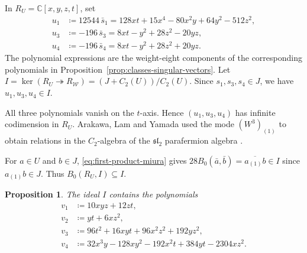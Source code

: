 \documentclass[11pt]{amsart}
\numberwithin{equation}{section}
\newtheorem{proposition}[theorem]{Proposition}
\theoremstyle{definition}
\theoremstyle{remark}
\newcommand{\CC}{\mathbb C}
\begin{document}
 

In $R_U=\CC[x,y,z,t]$, set
\begin{align}
 u_1&\coloneqq 12544\,\bar s_1
     =128xt+15x^4-80x^2y+64y^2-512z^2,\label{eq:u-one}\\[2pt]
 u_3&\coloneqq -196\,\bar s_3=8xt-y^2+28z^2-20yz,\label{eq:u-three}\\[2pt]
 u_4&\coloneqq -196\,\bar s_4=8xt-y^2+28z^2+20yz.\label{eq:u-four}
\end{align}
The polynomial expressions are the weight-eight components of the
corresponding polynomials in Proposition~\ref{prop:classes-singular-vectors}.
Let $I=\ker(R_U\twoheadrightarrow R_{\mathcal W})=(J+C_2(U))/C_2(U)$.
Since $s_1,s_3,s_4\in J$, we have $u_1,u_3,u_4\in I$.
	
All three polynomials vanish on the $t$-axis. Hence $(u_1,u_3,u_4)$
has infinite codimension in $R_U$.
Arakawa, Lam and Yamada used the mode $(W^3)_{(1)}$ to obtain
relations in the $C_2$-algebra of the $\mathfrak{sl}_2$ parafermion
algebra \cite[Proposition~5.4 and Section~6]{ALY}.

For $a\in U$ and $b\in J$, \eqref{eq:first-product-miura} gives
$28B_0(\bar a,\bar b)=\overline{a_{(1)}b}\in I$ since $a_{(1)}b\in J$.
Thus $B_0(R_U,I)\subseteq I$.

\begin{proposition}\label{prop:further-relations}
The ideal $I$ contains the polynomials
\[
\begin{aligned}
 v_1&\coloneqq 10xyz+12zt,\\
 v_2&\coloneqq yt+6xz^2,\\
 v_3&\coloneqq 96t^2+16xyt+96x^2z^2+192yz^2,\\
 v_4&\coloneqq 32x^3y-128xy^2-192x^2t+384yt-2304xz^2.
\end{aligned}
\]
\end{proposition}
\end{document}
